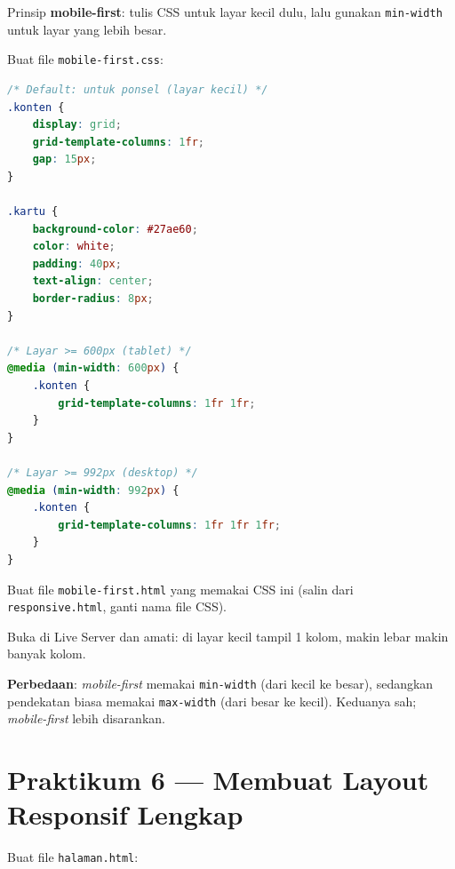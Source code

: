 Prinsip \textbf{mobile-first}: tulis CSS untuk layar kecil dulu, lalu gunakan \texttt{min-width} untuk layar yang lebih besar.

\begin{langkah}
  \item Buat file \texttt{mobile-first.css}:
\end{langkah}

\begin{lstlisting}[language=CSS, caption={Pendekatan mobile-first}, label={lst:mobile-first}]
/* Default: untuk ponsel (layar kecil) */
.konten {
    display: grid;
    grid-template-columns: 1fr;
    gap: 15px;
}

.kartu {
    background-color: #27ae60;
    color: white;
    padding: 40px;
    text-align: center;
    border-radius: 8px;
}

/* Layar >= 600px (tablet) */
@media (min-width: 600px) {
    .konten {
        grid-template-columns: 1fr 1fr;
    }
}

/* Layar >= 992px (desktop) */
@media (min-width: 992px) {
    .konten {
        grid-template-columns: 1fr 1fr 1fr;
    }
}
\end{lstlisting}

\begin{langkah}
  \item Buat file \texttt{mobile-first.html} yang memakai CSS ini (salin dari \texttt{responsive.html}, ganti nama file CSS).
  \item Buka di Live Server dan amati: di layar kecil tampil 1 kolom, makin lebar makin banyak kolom.
\end{langkah}

\begin{catatan}
\textbf{Perbedaan}: \emph{mobile-first} memakai \texttt{min-width} (dari kecil ke besar), sedangkan pendekatan biasa memakai \texttt{max-width} (dari besar ke kecil). Keduanya sah; \emph{mobile-first} lebih disarankan.
\end{catatan}

\section{Praktikum 6 --- Membuat Layout Responsif Lengkap}
\label{sec:grid-praktik-6}

\begin{langkah}
  \item Buat file \texttt{halaman.html}:
\end{langkah}

